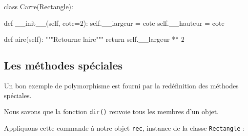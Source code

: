 \documentclass[
  a4paper,
  DIV=11,
  numbers=noendperiod]{scrartcl}
\newenvironment{Shaded}{\begin{snugshade}}{\end{snugshade}}
\newcommand{\CommentTok}[1]{\textcolor[rgb]{0.37,0.37,0.37}{#1}}
\newcommand{\ControlFlowTok}[1]{\textcolor[rgb]{0.00,0.23,0.31}{#1}}
\newcommand{\DecValTok}[1]{\textcolor[rgb]{0.68,0.00,0.00}{#1}}
\newcommand{\FunctionTok}[1]{\textcolor[rgb]{0.28,0.35,0.67}{#1}}
\newcommand{\KeywordTok}[1]{\textcolor[rgb]{0.00,0.23,0.31}{#1}}
\newcommand{\NormalTok}[1]{\textcolor[rgb]{0.00,0.23,0.31}{#1}}
\newcommand{\OperatorTok}[1]{\textcolor[rgb]{0.37,0.37,0.37}{#1}}
\newcommand{\VariableTok}[1]{\textcolor[rgb]{0.07,0.07,0.07}{#1}}
\begin{document}
\begin{Shaded}
\begin{Highlighting}[]
\KeywordTok{class}\NormalTok{ Carre(Rectangle):}

    \KeywordTok{def} \FunctionTok{\_\_init\_\_}\NormalTok{(}\VariableTok{self}\NormalTok{, cote}\OperatorTok{=}\DecValTok{2}\NormalTok{):}
        \VariableTok{self}\NormalTok{.\_\_largeur }\OperatorTok{=}\NormalTok{ cote}
        \VariableTok{self}\NormalTok{.\_\_hauteur }\OperatorTok{=}\NormalTok{ cote}
    
    \KeywordTok{def}\NormalTok{ aire(}\VariableTok{self}\NormalTok{):}
        \CommentTok{"""Retourne l\textquotesingle{}aire"""}
        \ControlFlowTok{return} \VariableTok{self}\NormalTok{.\_\_largeur }\OperatorTok{**} \DecValTok{2}
\end{Highlighting}
\end{Shaded}

\hypertarget{les-muxe9thodes-spuxe9ciales}{%
\subsection{Les méthodes spéciales}\label{les-muxe9thodes-spuxe9ciales}}

Un bon exemple de polymorphisme est fourni par la redéfinition des
méthodes spéciales.

Nous savons que la fonction \texttt{dir()} renvoie tous les membres d'un
objet.

Appliquons cette commande à notre objet \texttt{rec}, instance de la
classe \texttt{Rectangle} :
\end{document}
